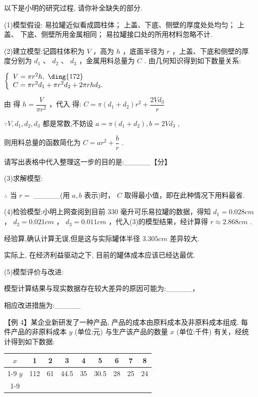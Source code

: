 以下是小明的研究过程, 请你补全缺失的部分.

(1)模型假设:  易拉罐近似看成圆柱体；  上盖、下底、侧壁的厚度处处均匀；  上盖、 下底、侧壁所用金属相同；  易拉罐接口处的所用材料忽略不计.

(2)建立模型:记圆柱体积为 $V$ ，高为 $h$ ，底面半径为 $r$ ，上盖、下底和侧壁的厚度分别为 ${d}_{1}$ 、 ${d}_{2}$ 、 ${d}_{3}$ ，金属用料总量为 $C$ . 由几何知识得到如下数量关系:

$\left\{  \begin{array}{l} V = \pi {r}^{2}h,\text{  \ding{172}  } \\  C = \pi {r}^{2}{d}_{1} + \pi {r}^{2}{d}_{2} + {2\pi rh}{d}_{3}. \end{array}\right.$

由    得 $h = \dfrac{V}{\pi {r}^{2}}$ ，代入    得: $C = \pi \left( {{d}_{1} + {d}_{2}}\right) {r}^{2} + \dfrac{{2V}{d}_{3}}{r}$

$\because V,{d}_{1},{d}_{2},{d}_{3}$ 都是常数,不妨设 $a = \pi \left( {{d}_{1} + {d}_{2}}\right) ,b = {2V}{d}_{3}$ ,

则用料总量的函数简化为 $C = a{r}^{2} + \dfrac{b}{r}$ .

请写出表格中代入整理这一步的目的是:\_\_\_\_\_【分】

(3)求解模型:

$\therefore$ 当 $r =$ \_\_\_\_\_(用 $a,b$ 表示)时， $C$ 取得最小值，即在此种情况下用料最省.

(4)检验模型:小明上网查阅到目前 330 毫升可乐易拉罐的数据，得知 ${d}_{1} = {0.028}{{cm}}$ ， ${d}_{2} = {0.021}{{cm}}$ ， ${d}_{3} = {0.011}{{cm}}$ ，代入(3)的模型结果，经计算得 $r \approx  {2.868}{{cm}}$ .

经验算,确认计算无误,但是这与实际罐体半径 ${3.305}{{cm}}$ 差异较大.

实际上, 在经济利益驱动之下, 目前的罐体成本应该已经达最优.

(5)模型评价与改进:

模型计算结果与现实数据存在较大差异的原因可能为:\_\_\_\_\_，

相应改进措施为:\_\_\_\_\_

【例 4】某企业新研发了一种产品, 产品的成本由原料成本及非原料成本组成. 每件产品的非原料成本 $y$ (单位:元) 与生产该产品的数量 $x$ (单位:千件) 有关，经统计得到如下数据:

\begin{center}
\begin{tabular}{|c|c|c|c|c|c|c|c|c|}
\hline
$x$ & 1 & 2 & 3 & 4 & 5 & 6 & 7 & 8 \\
\cline{1-9}
$y$ & 112 & 61 & 44.5 & 35 & 30.5 & 28 & 25 & 24 \\
\cline{1-9}
\hline
\end{tabular}
\end{center}

